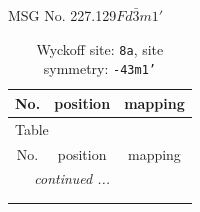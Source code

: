 \documentclass[fleqn,8pt]{jsarticle}
\begin{document}
\setcounter{MaxMatrixCols}{32}

\renewcommand{\tablename}{Table~}
\renewcommand{\figurename}{Figure~}
\begin{center}
\LARGE
MSG No. 227.129\quad$Fd\bar{3}m1'$
\end{center}
\renewcommand{\arraystretch}{1.2}
\begin{longtable}{ccc}
\caption{Wyckoff site: {\tt 8a}, site symmetry: {\tt -43m1'}}
 \\
 \hline \hline
No. & position & mapping \\ \hline \endfirsthead

\multicolumn{2}{l}{\tablename\ \thetable{}} \\
 \hline \hline
No. & position & mapping \\ \hline \endhead

 \hline \hline
\multicolumn{2}{r}{\footnotesize\it continued ...} \\ \endfoot

 \hline \hline
\multicolumn{2}{r}{} \\ \endlastfoot


\end{longtable}
\end{document}
